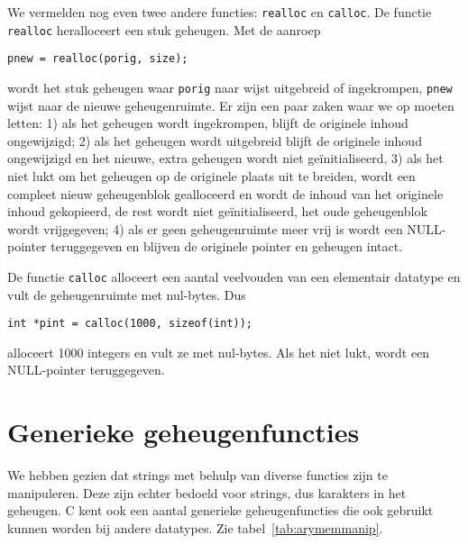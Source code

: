 We vermelden nog even twee andere functies: \texttt{realloc} en \texttt{calloc}. De functie \texttt{realloc} heralloceert een stuk geheugen. Met de aanroep

\hspace*{1em}\texttt{pnew = realloc(porig, size);}

wordt het stuk geheugen waar \texttt{porig} naar wijst uitgebreid of ingekrompen, \texttt{pnew} wijst naar de nieuwe geheugenruimte. Er zijn een paar zaken waar we op moeten letten: 1) als het geheugen wordt ingekrompen, blijft de originele inhoud ongewijzigd; 2) als het geheugen wordt uitgebreid blijft de originele inhoud ongewijzigd en het nieuwe, extra geheugen wordt niet geïnitialiseerd, 3) als het niet lukt om het geheugen op de originele plaats uit te breiden, wordt een compleet nieuw geheugenblok gealloceerd en wordt de inhoud van het originele inhoud gekopieerd, de rest wordt niet geïnitialiseerd, het oude geheugenblok wordt vrijgegeven; 4) als er geen geheugenruimte meer vrij is wordt een NULL-pointer teruggegeven en blijven de originele pointer en geheugen intact.

De functie \texttt{calloc} alloceert een aantal veelvouden van een elementair datatype en vult de geheugenruimte met nul-bytes. Dus

\hspace*{1em}\texttt{int *pint = calloc(1000, sizeof(int));}

alloceert 1000 integers en vult ze met nul-bytes. Als het niet lukt, wordt een NULL-pointer teruggegeven.


\section{Generieke geheugenfuncties}
We hebben gezien dat strings met behulp van diverse functies zijn te manipuleren. Deze zijn echter bedoeld voor strings, dus karakters in het geheugen. C kent ook een aantal generieke geheugenfuncties die ook gebruikt kunnen worden bij andere datatypes. Zie tabel~\ref{tab:arymemmanip}.

